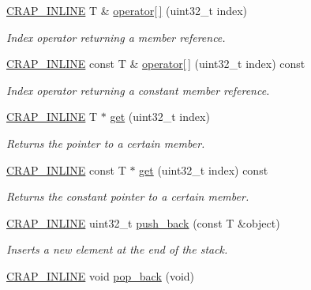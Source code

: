 \begin{DoxyCompactItemize}
\hyperlink{config__x86_8h_a5a40526b8d842e7ff731509998bb0f1c}{C\+R\+A\+P\+\_\+\+I\+N\+L\+I\+N\+E} T \& \hyperlink{classcrap_1_1stack_a3ea42e1bdd99a598df2f7b6912fc7841}{operator\mbox{[}$\,$\mbox{]}} (uint32\+\_\+t index)
\begin{DoxyCompactList}\small\item\em Index operator returning a member reference. \end{DoxyCompactList}\item 
\hyperlink{config__x86_8h_a5a40526b8d842e7ff731509998bb0f1c}{C\+R\+A\+P\+\_\+\+I\+N\+L\+I\+N\+E} const T \& \hyperlink{classcrap_1_1stack_a26ada541c71a2cf331c7ad2e2314d805}{operator\mbox{[}$\,$\mbox{]}} (uint32\+\_\+t index) const 
\begin{DoxyCompactList}\small\item\em Index operator returning a constant member reference. \end{DoxyCompactList}\item 
\hyperlink{config__x86_8h_a5a40526b8d842e7ff731509998bb0f1c}{C\+R\+A\+P\+\_\+\+I\+N\+L\+I\+N\+E} T $\ast$ \hyperlink{classcrap_1_1stack_a3e83f883fedd114b5af82cc584ab595c}{get} (uint32\+\_\+t index)
\begin{DoxyCompactList}\small\item\em Returns the pointer to a certain member. \end{DoxyCompactList}\item 
\hyperlink{config__x86_8h_a5a40526b8d842e7ff731509998bb0f1c}{C\+R\+A\+P\+\_\+\+I\+N\+L\+I\+N\+E} const T $\ast$ \hyperlink{classcrap_1_1stack_a8a2d2d68dc9b4b70d875bb4a3eb45668}{get} (uint32\+\_\+t index) const 
\begin{DoxyCompactList}\small\item\em Returns the constant pointer to a certain member. \end{DoxyCompactList}\item 
\hyperlink{config__x86_8h_a5a40526b8d842e7ff731509998bb0f1c}{C\+R\+A\+P\+\_\+\+I\+N\+L\+I\+N\+E} uint32\+\_\+t \hyperlink{classcrap_1_1stack_ac4942fe577eccbdc05e19caa8d65b33f}{push\+\_\+back} (const T \&object)
\begin{DoxyCompactList}\small\item\em Inserts a new element at the end of the stack. \end{DoxyCompactList}\item 
\hyperlink{config__x86_8h_a5a40526b8d842e7ff731509998bb0f1c}{C\+R\+A\+P\+\_\+\+I\+N\+L\+I\+N\+E} void \hyperlink{classcrap_1_1stack_a65dd43f3f03dbf398b10f0c3c0f9d410}{pop\+\_\+back} (void)

\end{DoxyCompactItemize}
